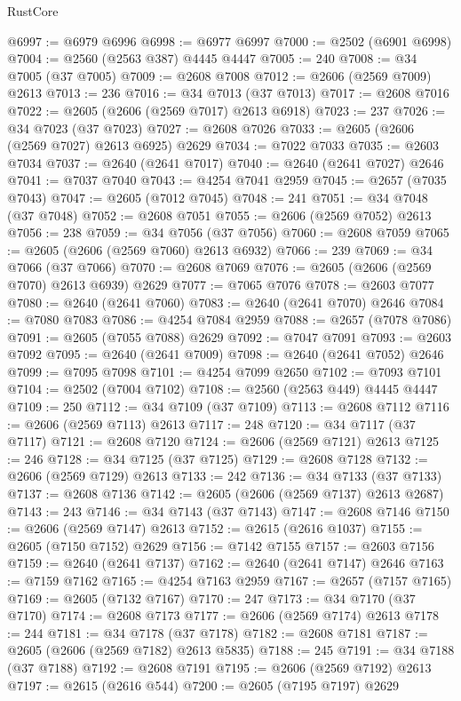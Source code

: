 \begin{lexlean}{RustCore}
\begin{coremodule}
@6997 := @6979 @6996
@6998 := @6977 @6997
@7000 := @2502 (@6901 @6998)
@7004 := @2560 (@2563 @387) @4445 @4447
@7005 := 240
@7008 := @34 @7005 (@37 @7005)
@7009 := @2608 @7008
@7012 := @2606 (@2569 @7009) @2613
@7013 := 236
@7016 := @34 @7013 (@37 @7013)
@7017 := @2608 @7016
@7022 := @2605 (@2606 (@2569 @7017) @2613 @6918)
@7023 := 237
@7026 := @34 @7023 (@37 @7023)
@7027 := @2608 @7026
@7033 := @2605 (@2606 (@2569 @7027) @2613 @6925) @2629
@7034 := @7022 @7033
@7035 := @2603 @7034
@7037 := @2640 (@2641 @7017)
@7040 := @2640 (@2641 @7027) @2646
@7041 := @7037 @7040
@7043 := @4254 @7041 @2959
@7045 := @2657 (@7035 @7043)
@7047 := @2605 (@7012 @7045)
@7048 := 241
@7051 := @34 @7048 (@37 @7048)
@7052 := @2608 @7051
@7055 := @2606 (@2569 @7052) @2613
@7056 := 238
@7059 := @34 @7056 (@37 @7056)
@7060 := @2608 @7059
@7065 := @2605 (@2606 (@2569 @7060) @2613 @6932)
@7066 := 239
@7069 := @34 @7066 (@37 @7066)
@7070 := @2608 @7069
@7076 := @2605 (@2606 (@2569 @7070) @2613 @6939) @2629
@7077 := @7065 @7076
@7078 := @2603 @7077
@7080 := @2640 (@2641 @7060)
@7083 := @2640 (@2641 @7070) @2646
@7084 := @7080 @7083
@7086 := @4254 @7084 @2959
@7088 := @2657 (@7078 @7086)
@7091 := @2605 (@7055 @7088) @2629
@7092 := @7047 @7091
@7093 := @2603 @7092
@7095 := @2640 (@2641 @7009)
@7098 := @2640 (@2641 @7052) @2646
@7099 := @7095 @7098
@7101 := @4254 @7099 @2650
@7102 := @7093 @7101
@7104 := @2502 (@7004 @7102)
@7108 := @2560 (@2563 @449) @4445 @4447
@7109 := 250
@7112 := @34 @7109 (@37 @7109)
@7113 := @2608 @7112
@7116 := @2606 (@2569 @7113) @2613
@7117 := 248
@7120 := @34 @7117 (@37 @7117)
@7121 := @2608 @7120
@7124 := @2606 (@2569 @7121) @2613
@7125 := 246
@7128 := @34 @7125 (@37 @7125)
@7129 := @2608 @7128
@7132 := @2606 (@2569 @7129) @2613
@7133 := 242
@7136 := @34 @7133 (@37 @7133)
@7137 := @2608 @7136
@7142 := @2605 (@2606 (@2569 @7137) @2613 @2687)
@7143 := 243
@7146 := @34 @7143 (@37 @7143)
@7147 := @2608 @7146
@7150 := @2606 (@2569 @7147) @2613
@7152 := @2615 (@2616 @1037)
@7155 := @2605 (@7150 @7152) @2629
@7156 := @7142 @7155
@7157 := @2603 @7156
@7159 := @2640 (@2641 @7137)
@7162 := @2640 (@2641 @7147) @2646
@7163 := @7159 @7162
@7165 := @4254 @7163 @2959
@7167 := @2657 (@7157 @7165)
@7169 := @2605 (@7132 @7167)
@7170 := 247
@7173 := @34 @7170 (@37 @7170)
@7174 := @2608 @7173
@7177 := @2606 (@2569 @7174) @2613
@7178 := 244
@7181 := @34 @7178 (@37 @7178)
@7182 := @2608 @7181
@7187 := @2605 (@2606 (@2569 @7182) @2613 @5835)
@7188 := 245
@7191 := @34 @7188 (@37 @7188)
@7192 := @2608 @7191
@7195 := @2606 (@2569 @7192) @2613
@7197 := @2615 (@2616 @544)
@7200 := @2605 (@7195 @7197) @2629

\end{coremodule}
\end{lexlean}
